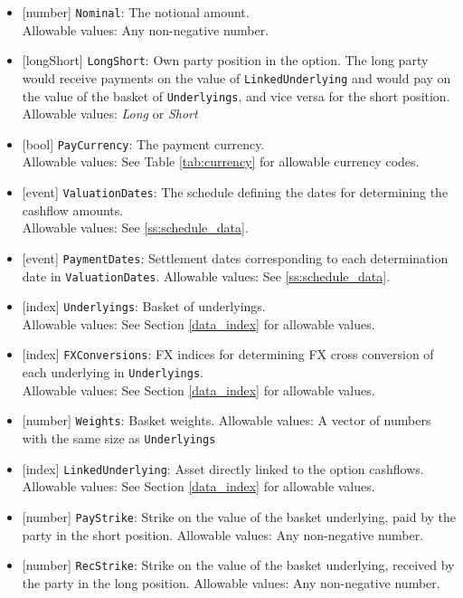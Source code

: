 \begin{itemize} 
  \item{}[number] \lstinline!Nominal!: The notional amount. \\
  Allowable values: Any non-negative number.
  \item{}[longShort] \lstinline!LongShort!: Own party position in the option. The long party
  would receive payments on the value of \lstinline!LinkedUnderlying! and would pay on the
  value of the basket of \lstinline!Underlyings!, and vice versa for the short position. \\
  Allowable values: \emph{Long} or \emph{Short}
  \item{}[bool] \lstinline!PayCurrency!: The payment currency. \\
  Allowable values: See Table \ref{tab:currency} for allowable currency codes.
  \item{}[event] \lstinline!ValuationDates!: The schedule defining the dates for determining
  the cashflow amounts. \\
  Allowable values: See \ref{ss:schedule_data}.
  \item{}[event] \lstinline!PaymentDates!: Settlement dates corresponding to each determination date
  in \lstinline!ValuationDates!.
  Allowable values: See \ref{ss:schedule_data}.
  \item{}[index] \lstinline!Underlyings!: Basket of underlyings. \\
  Allowable values: See Section \ref{data_index} for allowable values.
  \item{}[index] \lstinline!FXConversions!: FX indices for determining FX cross conversion of each
  underlying in \lstinline!Underlyings!. \\
  Allowable values: See Section \ref{data_index} for allowable values.
  \item{}[number] \lstinline!Weights!: Basket weights.
  Allowable values: A vector of numbers with the same size as \lstinline!Underlyings!
  \item{}[index] \lstinline!LinkedUnderlying!: Asset directly linked to the option cashflows. \\
  Allowable values: See Section \ref{data_index} for allowable values.
  \item{}[number] \lstinline!PayStrike!: Strike on the value of the basket underlying, paid by the
  party in the short position.
  Allowable values: Any non-negative number.
  \item{}[number] \lstinline!RecStrike!: Strike on the value of the basket underlying, received by
  the party in the long position.
  Allowable values: Any non-negative number.
\end{itemize}

